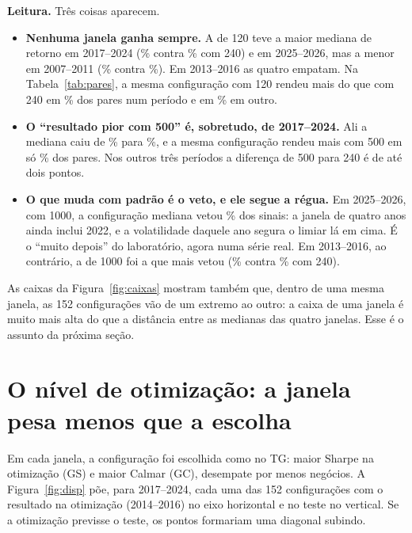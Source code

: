 \documentclass[11pt,a4paper]{article}
\begin{document}
\textbf{Leitura.} Três coisas aparecem.

\begin{itemize}\setlength\itemsep{2pt}
\item \textbf{Nenhuma janela ganha sempre.} A de 120 teve a maior mediana de retorno em 2017--2024
(\% contra \% com 240) e em 2025--2026, mas a menor
em 2007--2011 (\% contra \%). Em 2013--2016 as
quatro empatam. Na Tabela~\ref{tab:pares}, a mesma configuração com 120 rendeu mais do que com 240 em
\% dos pares num período e em \% em outro.
\item \textbf{O ``resultado pior com 500'' é, sobretudo, de 2017--2024.} Ali a mediana caiu de
\% para \%, e a mesma configuração rendeu mais com
500 em só \% dos pares. Nos outros três períodos a diferença de 500 para 240 é de
até dois pontos.
\item \textbf{O que muda com padrão é o veto, e ele segue a régua.} Em 2025--2026, com 1000, a configuração
mediana vetou \% dos sinais: a janela de quatro anos ainda inclui 2022, e a
volatilidade daquele ano segura o limiar lá em cima. É o ``muito depois'' do laboratório, agora numa série real.
Em 2013--2016, ao contrário, a de 1000 foi a que mais vetou (\% contra
\% com 240).
\end{itemize}

As caixas da Figura~\ref{fig:caixas} mostram também que, dentro de uma mesma janela, as 152 configurações vão de
um extremo ao outro: a caixa de uma janela é muito mais alta do que a distância entre as medianas das quatro
janelas. Esse é o assunto da próxima seção.

\section{O nível de otimização: a janela pesa menos que a escolha}\label{sec:otim}

Em cada janela, a configuração foi escolhida como no TG: maior Sharpe na otimização (GS) e maior Calmar (GC),
desempate por menos negócios. A Figura~\ref{fig:disp} põe, para 2017--2024, cada uma das 152 configurações com o
resultado na otimização (2014--2016) no eixo horizontal e no teste no vertical. Se a otimização previsse o teste,
os pontos formariam uma diagonal subindo.
\end{document}
